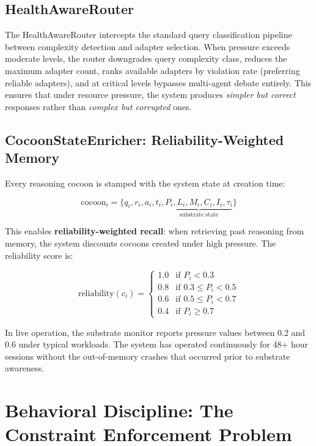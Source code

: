 \documentclass[11pt,a4paper]{article}
\begin{document}
\subsection{HealthAwareRouter}

The HealthAwareRouter intercepts the standard query classification pipeline
between complexity detection and adapter selection. When pressure exceeds
moderate levels, the router downgrades query complexity class, reduces the
maximum adapter count, ranks available adapters by violation rate (preferring
reliable adapters), and at critical levels bypasses multi-agent debate entirely.
This ensures that under resource pressure, the system produces \emph{simpler
but correct} responses rather than \emph{complex but corrupted} ones.

\subsection{CocoonStateEnricher: Reliability-Weighted Memory}

Every reasoning cocoon is stamped with the system state at creation time:

\begin{equation}
\text{cocoon}_i = \{q_i, r_i, a_i, t_i, \underbrace{P_i, L_i, M_i, C_i, I_i, \tau_i}_{\text{substrate state}}\}
\end{equation}

This enables \textbf{reliability-weighted recall}: when retrieving past
reasoning from memory, the system discounts cocoons created under high
pressure. The reliability score is:

\begin{equation}
\text{reliability}(c_i) = \begin{cases}
1.0 & \text{if } P_i < 0.3 \\
0.8 & \text{if } 0.3 \leq P_i < 0.5 \\
0.6 & \text{if } 0.5 \leq P_i < 0.7 \\
0.4 & \text{if } P_i \geq 0.7
\end{cases}
\label{eq:reliability}
\end{equation}

In live operation, the substrate monitor reports pressure values between 0.2
and 0.6 under typical workloads. The system has operated continuously for 48+
hour sessions without the out-of-memory crashes that occurred prior to
substrate awareness.

\section{Behavioral Discipline: The Constraint Enforcement Problem}
\label{sec:behavioral}
\end{document}
